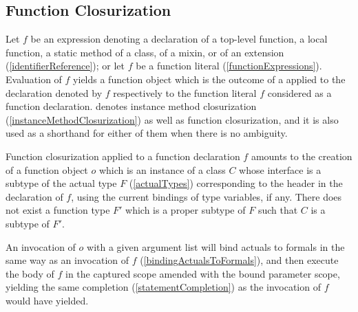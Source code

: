 \documentclass[makeidx]{article}
\begin{document}
{\subsection{Function Closurization}

\LMHash{}%
Let $f$ be an expression denoting
a declaration of a top-level function, a local function,
a static method of a class, of a mixin, or of an extension
(\ref{identifierReference});
or let $f$ be a function literal
(\ref{functionExpressions}).
Evaluation of $f$ yields a function object
which is the outcome of a 
applied to the declaration denoted by $f$
respectively to the function literal $f$ considered as a function declaration.
denotes instance method closurization
(\ref{instanceMethodClosurization})
as well as function closurization,
and it is also used as a shorthand for either of them
when there is no ambiguity.

\LMHash{}%
Function closurization applied to a function declaration $f$
amounts to the creation of a function object $o$
which is an instance of a class $C$ whose interface is
a subtype of the actual type $F$
(\ref{actualTypes})
corresponding to the header in the declaration of $f$,
using the current bindings of type variables, if any.
There does not exist a function type $F'$ which is a proper subtype of $F$
such that $C$ is a subtype of $F'$.



\LMHash{}%
An invocation of $o$ with a given argument list will bind actuals to formals
in the same way as an invocation of $f$
(\ref{bindingActualsToFormals}),
and then execute the body of $f$
in the captured scope amended with the bound parameter scope,
yielding the same completion
(\ref{statementCompletion})
as the invocation of $f$ would have yielded.

}
\end{document}

